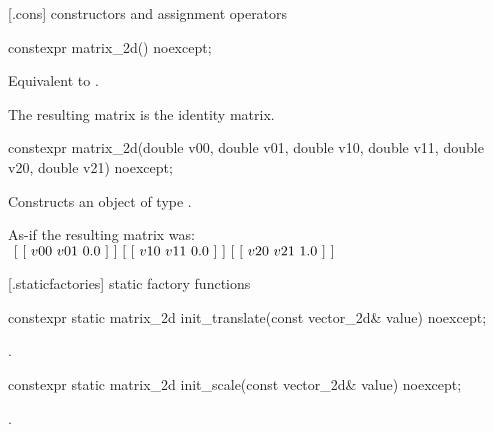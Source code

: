 [\matrixtwod.cons] { constructors and assignment operators}

\begin{itemdecl}
constexpr matrix_2d() noexcept;
\end{itemdecl}
\begin{itemdescr}
\pnum
\effects
Equivalent to .

\pnum
\begin{note}
The resulting matrix is the identity matrix.
\end{note}
\end{itemdescr}

\begin{itemdecl}
constexpr matrix_2d(double v00, double v01, double v10, double v11,
  double v20, double v21) noexcept;
\end{itemdecl}
\begin{itemdescr}
\pnum
\effects
Constructs an object of type .

\pnum
As-if the resulting matrix was: \\
$
~[~[~v00~v01~0.0~]~] \\
~[~[~v10~v11~0.0~]~] \\
~[~[~v20~v21~1.0~]~]$

%
%
%
%
%
\end{itemdescr}

 [\matrixtwod.staticfactories] { static factory 
functions}

\begin{itemdecl}
constexpr static matrix_2d init_translate(const vector_2d& value) noexcept;
\end{itemdecl}
\begin{itemdescr}
\pnum
\returns
{}.
\end{itemdescr}

\begin{itemdecl}
constexpr static matrix_2d init_scale(const vector_2d& value) noexcept;
\end{itemdecl}
\begin{itemdescr}
\pnum
\returns
{}.
\end{itemdescr}

